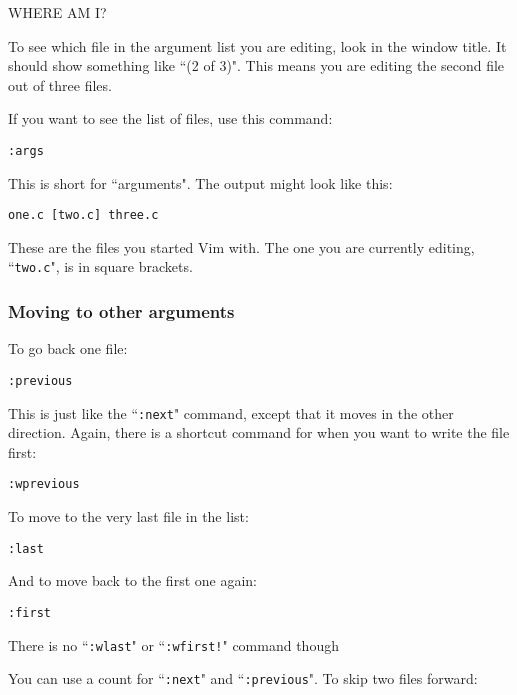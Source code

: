 WHERE AM I?

To see which file in the argument list you are editing, look in the window title.
It should show something like ``(2 of 3)".
This means you are editing the second file out of three files.

If you want to see the list of files, use this command:

 \begin{Verbatim}[samepage=true]
 :args
 \end{Verbatim}

This is short for ``arguments".
The output might look like this:

		\begin{Verbatim}[samepage=true]
    one.c [two.c] three.c 
						\end{Verbatim}

These are the files you started Vim with.
The one you are currently editing, ``\texttt{two.c}", is in square brackets.

\subsubsection{Moving to other arguments}
To go back one file:

 \begin{Verbatim}[samepage=true]
 :previous
 \end{Verbatim}

This is just like the ``\texttt{:next}" command, except that it moves in the other direction.
Again, there is a shortcut command for when you want to write the file first:

 \begin{Verbatim}[samepage=true]
 :wprevious
 \end{Verbatim}

To move to the very last file in the list:

 \begin{Verbatim}[samepage=true]
 :last
 \end{Verbatim}

And to move back to the first one again:

 \begin{Verbatim}[samepage=true]
 :first
 \end{Verbatim}

There is no ``\texttt{:wlast}" or ``\texttt{:wfirst!}" command though

You can use a count for ``\texttt{:next}" and ``\texttt{:previous}".
To skip two files forward:

